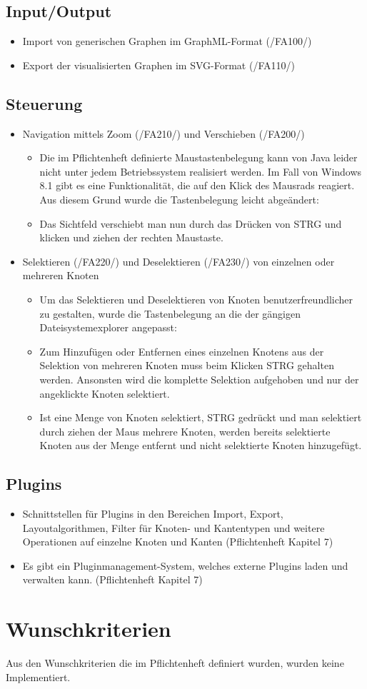 \subsection{Input/Output}
\begin{itemize}
	\item Import von generischen Graphen im GraphML-Format (/FA100/)
	\item Export der visualisierten Graphen im SVG-Format (/FA110/)
\end{itemize}

\subsection{Steuerung}
\begin{itemize}
	\item Navigation mittels Zoom (/FA210/) und Verschieben (/FA200/)
	\begin{itemize}
		\item Die im Pflichtenheft definierte Maustastenbelegung kann von Java leider nicht unter jedem Betriebssystem realisiert werden. Im Fall von Windows 8.1 gibt es eine Funktionalität, die auf den Klick des Mausrads reagiert. Aus diesem Grund wurde die Tastenbelegung leicht abgeändert:
		\item Das Sichtfeld verschiebt man nun durch das Drücken von STRG und klicken und ziehen der rechten Maustaste.
	\end{itemize}
	\item Selektieren (/FA220/) und Deselektieren (/FA230/) von einzelnen oder mehreren Knoten
	\begin{itemize}
		\item Um das Selektieren und Deselektieren von Knoten benutzerfreundlicher zu gestalten, wurde die Tastenbelegung an die der gängigen Dateisystemexplorer angepasst:
		\item Zum Hinzufügen oder Entfernen eines einzelnen Knotens aus der Selektion von mehreren Knoten muss beim Klicken STRG gehalten werden. Ansonsten wird die komplette Selektion aufgehoben und nur der angeklickte Knoten selektiert.
		\item Ist eine Menge von Knoten selektiert, STRG gedrückt und man selektiert durch ziehen der Maus mehrere Knoten, werden bereits selektierte Knoten aus der Menge entfernt und nicht selektierte Knoten hinzugefügt.
	\end{itemize}
\end{itemize}

\subsection{Plugins}
\begin{itemize}
	\item Schnittstellen für Plugins in den Bereichen Import, Export, Layoutalgorithmen, Filter für Knoten- und Kantentypen und weitere Operationen auf einzelne Knoten und Kanten (Pflichtenheft Kapitel 7)
	\item Es gibt ein Pluginmanagement-System, welches externe Plugins laden und verwalten kann. (Pflichtenheft Kapitel 7)
\end{itemize}

\section{Wunschkriterien}
Aus den Wunschkriterien die im Pflichtenheft definiert wurden, wurden keine Implementiert.